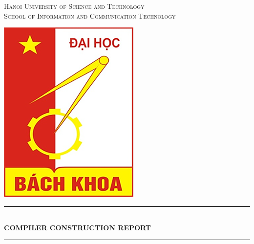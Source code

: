 \documentclass[12pt, a4paper]{article}
\begin{document}
\begin{titlepage}

\newcommand{\HRule}{\rule{\linewidth}{0.5mm}} %

\center %
 

{
	\textsc{\LARGE Hanoi University of Science and Technology}\\[0.5cm] %
	\textsc{\Large School of Information and Communication Technology}\\[1.5cm] %
}


\includegraphics{logo.png}\\[1cm] %

\HRule \\[0.6cm]
{
	{ \huge \bfseries COMPILER CONSTRUCTION REPORT}\\[0.5cm] %
}
\HRule \\[1.5cm]



\end{titlepage}
\end{document}
